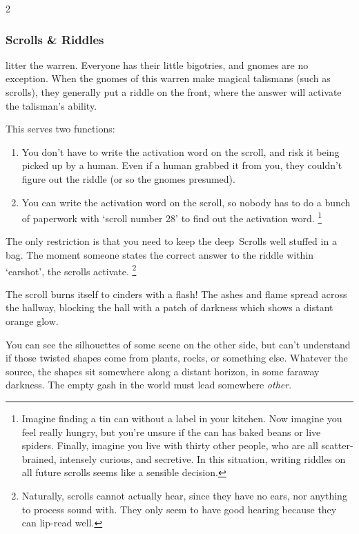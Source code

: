 \begin{multicols}{2}
\subsubsection{Scrolls \& Riddles}
\label{scrollRiddles}
litter the \gls{warren}.
Everyone has their little bigotries, and gnomes are no exception.
When the gnomes of this \gls{warren} make magical \glspl{talisman} (such as scrolls), they generally put a riddle on the front, where the answer will activate the \gls{talisman}'s ability.

This serves two functions:

\begin{enumerate}
  \item
  You don't have to write the activation word on the scroll, and risk it being picked up by a human.
  Even if a human grabbed it from you, they couldn't figure out the riddle (or so the gnomes presumed).
  \item
  You can write the activation word on the scroll, so nobody has to do a bunch of paperwork with `scroll number 28' to find out the activation word.%
  \footnote{Imagine finding a tin can without a label in your kitchen.
  Now imagine you feel really hungry, but you're unsure if the can has baked beans or live spiders.
  Finally, imagine you live with thirty other people, who are all scatter-brained, intensely curious, and secretive.
  In this situation, writing riddles on all future scrolls seems like a sensible decision.}
\end{enumerate}

The only restriction is that you need to keep the \Gls{deep}~Scrolls well stuffed in a bag.
The moment someone states the correct answer to the riddle within `earshot', the scrolls activate.%
\footnote{Naturally, scrolls cannot actually hear, since they have no ears, nor anything to process sound with.  They only seem to have good hearing because they can lip-read well.}

\labyrinthScroll

\showTalisman

\begin{boxtext}
  The scroll burns itself to cinders with a flash!
  The ashes and flame spread across the hallway, blocking the hall with a patch of darkness which shows a distant orange glow.

  You can see the silhouettes of some scene on the other side, but can't understand if those twisted shapes come from plants, rocks, or something else.
  Whatever the source, the shapes sit somewhere along a distant horizon, in some faraway darkness.
  The empty gash in the world must lead somewhere \emph{other}.
\end{boxtext}


\end{multicols}
